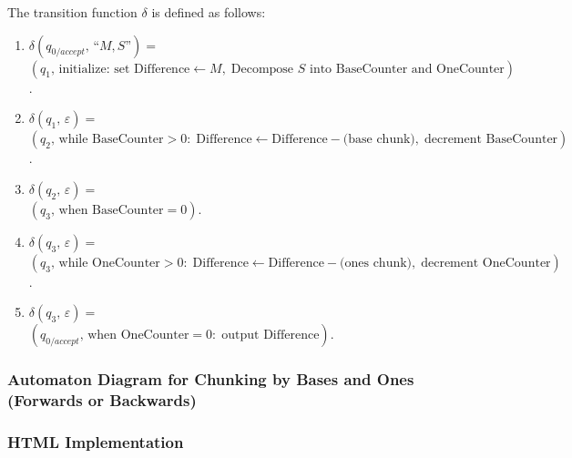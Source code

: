 \documentclass[11pt]{article}
\begin{document}
The transition function \(\delta\) is defined as follows:
\begin{enumerate}
    \item \(\delta(q_{0/accept},\, \text{``}M,S\text{''}) = \) \\ \( (q_1,\, \text{initialize: set Difference} \gets M,\; \text{Decompose } S \text{ into BaseCounter and OneCounter})\).
    \item \(\delta(q_1,\, \varepsilon) = \) \\ \(  (q_2,\, \text{while BaseCounter} > 0:\; \text{Difference} \gets \text{Difference} - \text{(base chunk)},\; \text{decrement BaseCounter})\).
    \item \(\delta(q_2,\, \varepsilon) =  \) \\ \( (q_3,\, \text{when BaseCounter} = 0)\).
    \item \(\delta(q_3,\, \varepsilon) = \) \\ \(  (q_3,\, \text{while OneCounter} > 0:\; \text{Difference} \gets \text{Difference} - \text{(ones chunk)},\; \text{decrement OneCounter})\).
    \item \(\delta(q_3,\, \varepsilon) =  \) \\ \( (q_{0/accept},\, \text{when OneCounter} = 0:\; \text{output Difference})\).
\end{enumerate}

\subsubsection*{Automaton Diagram for Chunking by Bases and Ones (Forwards or Backwards)}


\clearpage





\subsubsection*{HTML Implementation}


\printbibliography
\end{document}
